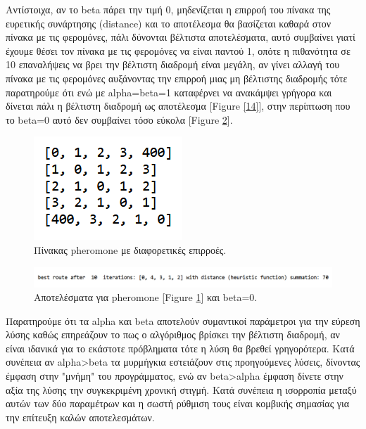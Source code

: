 Αντίστοιχα, αν το beta πάρει την τιμή 0, μηδενίζεται η επιρροή του πίνακα της ευρετικής συνάρτησης (distance) και το αποτέλεσμα θα βασίζεται καθαρά στον πίνακα με τις φερομόνες, πάλι δύνονται βέλτιστα αποτελέσματα, αυτό συμβαίνει γιατί έχουμε θέσει τον πίνακα με τις φερομόνες να είναι παντού 1, οπότε η πιθανότητα σε 10 επαναλήψεις να βρει την βέλτιστη διαδρομή είναι μεγάλη, αν γίνει αλλαγή του πίνακα με τις φερομόνες αυξάνοντας την επιρροή μιας μη βέλτιστης διαδρομής τότε παρατηρούμε ότι ενώ με alpha=beta=1 καταφέρνει να ανακάμψει γρήγορα και δίνεται πάλι η βέλτιστη διαδρομή ως αποτέλεσμα [Figure \ref{14}], στην περίπτωση που το beta=0 αυτό δεν συμβαίνει τόσο εύκολα [Figure \ref{16}].

\begin{figure}
    \centering
    \includegraphics[scale=1]{2947_thesis/pictures/pheromone.png} 
    \caption{Πίνακας pheromone με διαφορετικές επιρροές.}
    \label{15}
\end{figure}
\begin{figure}
    \centering
    \includegraphics[scale=0.55]{2947_thesis/pictures/ex3.png} 
    \caption{Αποτελέσματα για pheromone [Figure \ref{15}] και beta=0.}
    \label{16}
\end{figure}
Παρατηρούμε ότι τα alpha και beta αποτελούν συμαντικοί παράμετροι για την εύρεση λύσης καθώς επηρεάζουν το πως ο αλγόριθμος βρίσκει την βέλτιστη διαδρομή, αν είναι ιδανικά  για το εκάστοτε πρόβληματα τότε η λύση θα βρεθεί γρηγορότερα. Κατά συνέπεια αν alpha>beta τα μυρμήγκια εστειάζουν στις προηγούμενες λύσεις, δίνοντας έμφαση στην "μνήμη" του προγράμματος, ενώ αν beta>alpha έμφαση δίνετε στην αξία της λύσης την συγκεκριμένη χρονική στιγμή. Κατά συνέπεια η ισορροπία μεταξύ αυτών των δύο παραμέτρων και η σωστή ρύθμιση τους είναι κομβικής σημασίας για την επίτευξη καλών αποτελεσμάτων. 



